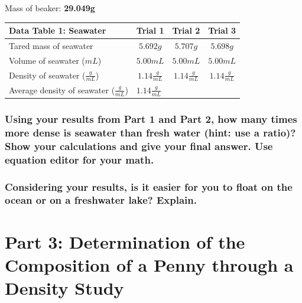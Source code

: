\documentclass[a4paper,10pt]{article}
\begin{document}
    Mass of beaker: \textbf{29.049g}

    \begin{table}[h!]
      \renewcommand{\arraystretch}{1.5}
      \label{tab:table1}
      \begin{tabular}{|l|c|c|c|}
      \hline
      \textbf{Data Table 1: Seawater} & \textbf{Trial 1} & \textbf{Trial 2} & \textbf{Trial 3}\\
      \hline
      Tared mass of seawater & $5.692g$ & $5.707g$ & $5.698g$ \\
      \hline
      Volume of seawater ($mL$) & $5.00mL$ & $5.00mL$ & $5.00mL$ \\
      \hline
      Density of seawater ($\frac{g}{mL}$) & $1.14\frac{g}{mL}$ &  $1.14\frac{g}{mL}$ & $1.14\frac{g}{mL}$ \\
      \hline
      Average density of seawater ($\frac{g}{mL}$) & \multicolumn{2}{l}{$1.14\frac{g}{mL}$} & \\
      \hline
      \end{tabular}
    \end{table}

    \subsubsection*{Using your results from Part 1 and Part 2, how many times more dense is seawater than fresh water (hint: use a ratio)? Show your calculations and give your final answer. Use equation editor for your math.}

    \subsubsection*{Considering your results, is it easier for you to float on the ocean or on a freshwater lake? Explain.}

  \section{Part 3: Determination of the Composition of a Penny through a Density Study}
\end{document}
